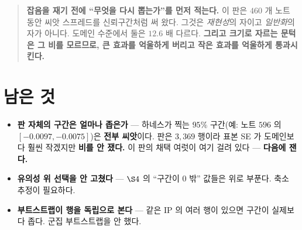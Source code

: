 \documentclass[11pt]{article}
\begin{document}
\begin{quote}
\textbf{잡음을 재기 전에 ``무엇을 다시 뽑는가''를 먼저 적는다.} 이 판은
$460$ 개 노트 동안 씨앗 스프레드를 신뢰구간처럼 써 왔다. 그것은
\emph{재현성}의 자이고 \emph{일반화}의 자가 아니다. 도메인 수준에서 둘은
$12.6$ 배 다르다. \textbf{그리고 크기로 자르는 문턱은 그 비를 모르므로,
큰 효과를 억울하게 버리고 작은 효과를 억울하게 통과시킨다.}
\end{quote}

\section*{남은 것}

\begin{itemize}
\item \textbf{판 자체의 구간은 얼마나 좁은가} --- 하네스가 찍는 $95\%$
구간(예: 노트 $596$ 의 $[-0.0097,-0.0075]$)은 \textbf{전부 씨앗}이다.
판은 $3{,}369$ 행이라 표본 SE 가 도메인보다 훨씬 작겠지만 \textbf{비를
안 쟀다.} 이 판의 채택 여럿이 여기 걸려 있다 --- \textbf{다음에 잰다.}
\item \textbf{유의성 위 선택을 안 고쳤다} --- $\S4$ 의 ``구간이 $0$ 밖''
값들은 위로 부푼다. 축소 추정이 필요하다.
\item \textbf{부트스트랩이 행을 독립으로 본다} --- 같은 IP 의 여러 행이
있으면 구간이 실제보다 좁다. 군집 부트스트랩을 안 했다.
\end{itemize}
\end{document}
